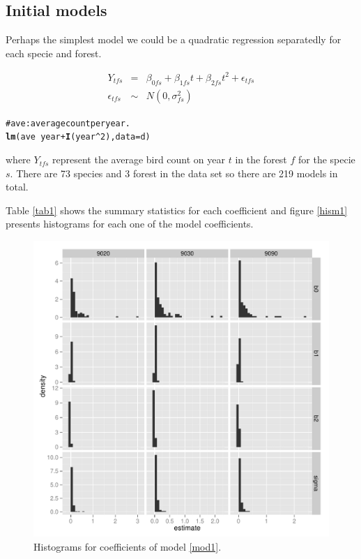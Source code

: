 \documentclass{article}\usepackage{graphicx, color}
\makeatletter
\newcommand{\hlfunctioncall}[1]{\textcolor[rgb]{0.501960784313725,0,0.329411764705882}{\textbf{#1}}}%
\newcommand{\hlcomment}[1]{\textcolor[rgb]{0.180392156862745,0.6,0.341176470588235}{#1}}%
\newenvironment{kframe}{%
 \def\at@end@of@kframe{}%
 \ifinner\ifhmode%
  \def\at@end@of@kframe{\end{minipage}}%
  \begin{minipage}{\columnwidth}%
 \fi\fi%
 \def\FrameCommand##1{\hskip\@totalleftmargin \hskip-\fboxsep
 \colorbox{shadecolor}{##1}\hskip-\fboxsep
     \hskip-\linewidth \hskip-\@totalleftmargin \hskip\columnwidth}%
 \MakeFramed {\advance\hsize-\width
   \@totalleftmargin\z@ \linewidth\hsize
   \@setminipage}}%
 {\par\unskip\endMakeFramed%
 \at@end@of@kframe}
\newenvironment{knitrout}{}{} %
\makeatother
\begin{document}
\subsection{Initial models} 

Perhaps the simplest model we could be a quadratic regression separatedly for each specie and forest. 

\begin{eqnarray}
\nonumber Y_{tfs} &=&  \beta_{0fs} + \beta_{1fs}t + \beta_{2fs}t^2 + \epsilon_{tfs}  \\
\epsilon_{tfs} &\sim& N(0,\sigma_{fs}^2)
\label{mod1}
\end{eqnarray}

\begin{knitrout}
\color{fgcolor}\begin{kframe}
\begin{alltt}
\hlcomment{# ave : average count per year.}
\hlfunctioncall{lm}(ave ~ year + \hlfunctioncall{I}(year^2), data = d)
\end{alltt}
\end{kframe}
\end{knitrout}



where $Y_{tfs}$ represent the average bird count on year $t$ in the forest $f$ for the specie $s$. There are 73 species and 3 forest in the data set so there are 219 models in total. 

Table \ref{tab1} shows the summary statistics for each coefficient and figure \ref{hism1} presents histograms for each one of the model coefficients.

\begin{figure}[h!]
\centering
\includegraphics[scale=.6]{hist_m1.pdf}
\caption{Histograms for coefficients of model \ref{mod1}. \label{histm1}}
\end{figure}
\end{document}
